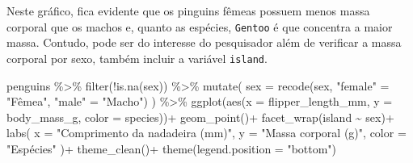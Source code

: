 \documentclass[
  12pt,
  letterpaper,
  DIV=11,
  numbers=noendperiod]{scrreprt}
\newenvironment{Shaded}{\begin{snugshade}}{\end{snugshade}}
\newcommand{\AttributeTok}[1]{\textcolor[rgb]{0.40,0.45,0.13}{#1}}
\newcommand{\FunctionTok}[1]{\textcolor[rgb]{0.28,0.35,0.67}{#1}}
\newcommand{\NormalTok}[1]{\textcolor[rgb]{0.00,0.23,0.31}{#1}}
\newcommand{\OtherTok}[1]{\textcolor[rgb]{0.00,0.23,0.31}{#1}}
\newcommand{\SpecialCharTok}[1]{\textcolor[rgb]{0.37,0.37,0.37}{#1}}
\newcommand{\StringTok}[1]{\textcolor[rgb]{0.13,0.47,0.30}{#1}}
\theoremstyle{definition}
\theoremstyle{exemplo}
\begin{document}
\noindent Neste gráfico, fica evidente que os pinguins fêmeas possuem
menos massa corporal que os machos e, quanto as espécies,
\texttt{Gentoo} é que concentra a maior massa. Contudo, pode ser do
interesse do pesquisador além de verificar a massa corporal por sexo,
também incluir a variável \texttt{island}.

\begin{Shaded}
\begin{Highlighting}[]
\NormalTok{penguins }\SpecialCharTok{\%\textgreater{}\%} 
  \FunctionTok{filter}\NormalTok{(}\SpecialCharTok{!}\FunctionTok{is.na}\NormalTok{(sex)) }\SpecialCharTok{\%\textgreater{}\%} 
  \FunctionTok{mutate}\NormalTok{(}
  \AttributeTok{sex =} \FunctionTok{recode}\NormalTok{(sex,}
         \StringTok{"female"} \OtherTok{=} \StringTok{"Fêmea"}\NormalTok{,}
         \StringTok{"male"} \OtherTok{=} \StringTok{"Macho"}\NormalTok{)}
\NormalTok{  ) }\SpecialCharTok{\%\textgreater{}\%} 
  \FunctionTok{ggplot}\NormalTok{(}\FunctionTok{aes}\NormalTok{(}\AttributeTok{x =}\NormalTok{ flipper\_length\_mm, }\AttributeTok{y =}\NormalTok{ body\_mass\_g, }\AttributeTok{color =}\NormalTok{ species))}\SpecialCharTok{+}
    \FunctionTok{geom\_point}\NormalTok{()}\SpecialCharTok{+}
    \FunctionTok{facet\_wrap}\NormalTok{(island }\SpecialCharTok{\textasciitilde{}}\NormalTok{ sex)}\SpecialCharTok{+}
    \FunctionTok{labs}\NormalTok{(}
      \AttributeTok{x =} \StringTok{"Comprimento da nadadeira (mm)"}\NormalTok{,}
      \AttributeTok{y =} \StringTok{"Massa corporal (g)"}\NormalTok{,}
      \AttributeTok{color =} \StringTok{"Espécies"}
\NormalTok{    )}\SpecialCharTok{+}
    \FunctionTok{theme\_clean}\NormalTok{()}\SpecialCharTok{+}
    \FunctionTok{theme}\NormalTok{(}\AttributeTok{legend.position =} \StringTok{"bottom"}\NormalTok{)}
\end{Highlighting}
\end{Shaded}
\end{document}
